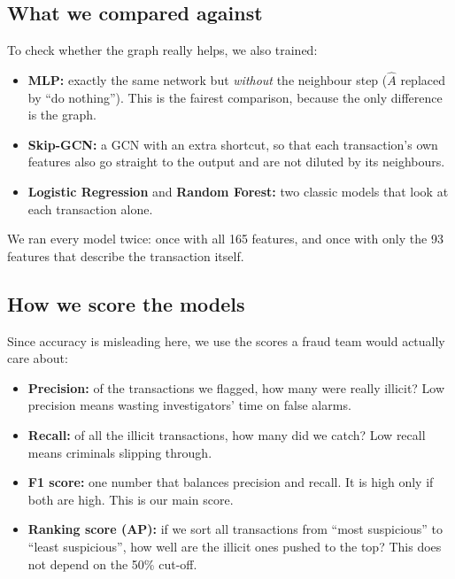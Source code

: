 \documentclass[11pt,a4paper]{article}
\newcommand{\Ahat}{\hat{A}}
\begin{document}
\subsection{What we compared against}
To check whether the graph really helps, we also trained:
\begin{itemize}
  \item \textbf{MLP:} exactly the same network but \emph{without} the neighbour step ($\Ahat$ replaced by ``do nothing'').
        This is the fairest comparison, because the only difference is the graph.
  \item \textbf{Skip-GCN:} a GCN with an extra shortcut, so that each transaction's own features also go straight to the
        output and are not diluted by its neighbours.
  \item \textbf{Logistic Regression} and \textbf{Random Forest:} two classic models that look at each transaction alone.
\end{itemize}
We ran every model twice: once with all 165 features, and once with only the 93 features that describe the transaction itself.

\subsection{How we score the models}
\label{sec:scores}
Since accuracy is misleading here, we use the scores a fraud team would actually care about:
\begin{itemize}
  \item \textbf{Precision:} of the transactions we flagged, how many were really illicit? Low precision means wasting
        investigators' time on false alarms.
  \item \textbf{Recall:} of all the illicit transactions, how many did we catch? Low recall means criminals slipping through.
  \item \textbf{F1 score:} one number that balances precision and recall. It is high only if both are high. This is our main score.
  \item \textbf{Ranking score (AP):} if we sort all transactions from ``most suspicious'' to ``least suspicious'', how well are the
        illicit ones pushed to the top? This does not depend on the 50\% cut-off.
\end{itemize}
\end{document}
